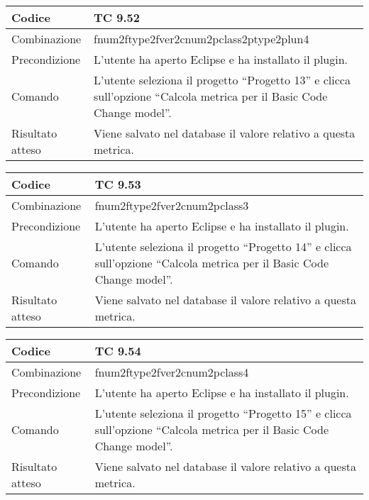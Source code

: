 \begin{table}[ht]
\begin{tabular}{|p{3cm}|p{9cm}|}
\hline
\cellcolor{lightgray}Codice				& TC 9.52								\\
\hline
\cellcolor{lightgray}Combinazione		& fnum2ftype2fver2cnum2pclass2ptype2plun4									\\
\hline
\cellcolor{lightgray}Precondizione		& L'utente ha aperto Eclipse e ha installato il plugin.		\\
\hline
\cellcolor{lightgray}Comando			& L'utente seleziona il progetto ``Progetto 13''  e clicca sull'opzione ``Calcola metrica per il Basic Code Change model''.	\\
\hline
\cellcolor{lightgray}Risultato atteso	& Viene salvato nel database il valore relativo a questa metrica.\\
\hline
\end{tabular}
\end{table}

\begin{table}[ht]
\begin{tabular}{|p{3cm}|p{9cm}|}
\hline
\cellcolor{lightgray}Codice				& TC 9.53								\\
\hline
\cellcolor{lightgray}Combinazione		& fnum2ftype2fver2cnum2pclass3									\\
\hline
\cellcolor{lightgray}Precondizione		& L'utente ha aperto Eclipse e ha installato il plugin.		\\
\hline
\cellcolor{lightgray}Comando			& L'utente seleziona il progetto ``Progetto 14''  e clicca sull'opzione ``Calcola metrica per il Basic Code Change model''.	\\
\hline
\cellcolor{lightgray}Risultato atteso	& Viene salvato nel database il valore relativo a questa metrica.\\
\hline
\end{tabular}
\end{table}

\begin{table}[ht]
\begin{tabular}{|p{3cm}|p{9cm}|}
\hline
\cellcolor{lightgray}Codice				& TC 9.54								\\
\hline
\cellcolor{lightgray}Combinazione		& fnum2ftype2fver2cnum2pclass4									\\
\hline
\cellcolor{lightgray}Precondizione		& L'utente ha aperto Eclipse e ha installato il plugin.		\\
\hline
\cellcolor{lightgray}Comando			& L'utente seleziona il progetto ``Progetto 15''  e clicca sull'opzione ``Calcola metrica per il Basic Code Change model''.	\\
\hline
\cellcolor{lightgray}Risultato atteso	& Viene salvato nel database il valore relativo a questa metrica.\\
\hline
\end{tabular}
\end{table}

